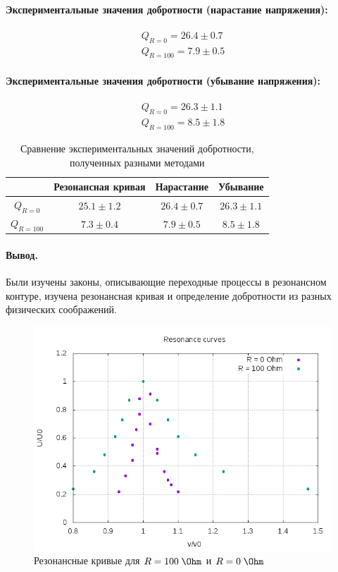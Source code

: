 \documentclass{../lab_class}
\begin{document}
\paragraph*{Экспериментальные значения добротности (нарастание напряжения):}
\begin{gather*}
Q_{R=0} = 26.4 \pm 0.7 \\
Q_{R=100} = 7.9 \pm 0.5
\end{gather*}

\paragraph*{Экспериментальные значения добротности (убывание напряжения):}
\begin{gather*}
Q_{R=0} = 26.3 \pm 1.1 \\
Q_{R=100} = 8.5 \pm 1.8
\end{gather*}

\begin{table}[H]
\centering
\begin{tabular}{|c|c|c|c|}
\hline
            & Резонансная кривая & Нарастание     & Убывание     \\ \hline
$Q_{R=0}$   & $25.1 \pm 1.2$     & $26.4 \pm 0.7$ & $26.3 \pm 1.1$ \\ \hline
$Q_{R=100}$ & $7.3 \pm 0.4$      & $7.9 \pm 0.5$  & $8.5 \pm 1.8$  \\ \hline
\end{tabular}
\caption{Сравнение экспериментальных значений добротности, полученных разными методами}
\end{table}

\paragraph{Вывод.}
Были изучены законы, описывающие переходные процессы в резонансном контуре, изучена резонансная кривая и определение добротности из разных физических соображений.

\bigskip

\begin{figure}[H]
\centering
\includegraphics[width = 0.9 \textwidth]{graph.png}
\caption{Резонансные кривые для $R = 100 \; \Ohm$ и $R = 0 \; \Ohm$}
\end{figure}
\end{document}
